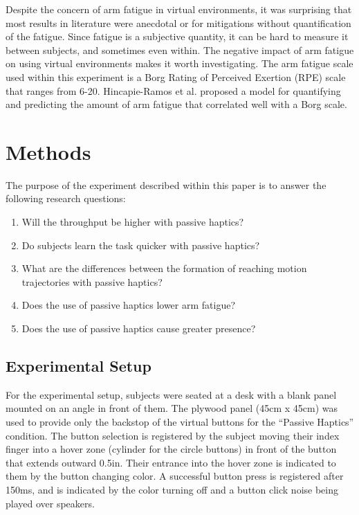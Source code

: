 Despite the concern of arm fatigue in virtual environments\cite{burdea_virtual_2003}, it was surprising that most results in literature were anecdotal or for mitigations without quantification of the fatigue.
Since fatigue is a subjective quantity, it can be hard to measure it between subjects, and sometimes even within.
The negative impact of arm fatigue on using virtual environments makes it worth investigating.
The arm fatigue scale used within this experiment is a Borg Rating of Perceived Exertion (RPE) scale that ranges from 6-20\cite{borg_borgs_1998}.
Hincapie-Ramos et al.\cite{hincapie-ramos_consumed_2014} proposed a model for quantifying and predicting the amount of arm fatigue that correlated well with a Borg scale.

\section{Methods}

The purpose of the experiment described within this paper is to answer the following research questions:

\begin{enumerate}
    \item Will the throughput be higher with passive haptics?
    \item Do subjects learn the task quicker with passive haptics?
    \item What are the differences between the formation of reaching motion trajectories with passive haptics?
    \item Does the use of passive haptics lower arm fatigue?
    \item Does the use of passive haptics cause greater presence?
\end{enumerate}

\subsection{Experimental Setup}

For the experimental setup, subjects were seated at a desk with a blank panel mounted on an angle in front of them.
The plywood panel (45cm x 45cm) was used to provide only the backstop of the virtual buttons for the ``Passive Haptics'' condition.
The button selection is registered by the subject moving their index finger into a hover zone (cylinder for the circle buttons) in front of the button that extends outward 0.5in.
Their entrance into the hover zone is indicated to them by the button changing color.
A successful button press is registered after 150ms, and is indicated by the color turning off and a button click noise being played over speakers.

